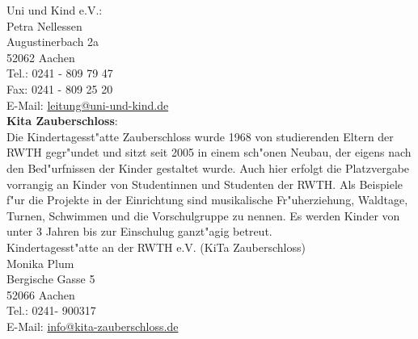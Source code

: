 \begin{artikel}{}
\vspace{-20pt}
Uni und Kind e.V.:\\
Petra Nellessen \\
Augustinerbach 2a\\
52062 Aachen\\
Tel.: 0241 - 809 79 47\\
Fax: 0241 - 809 25 20\\
E-Mail: \href{mailto:leitung@uni-und-kind.de}{leitung@uni-und-kind.de}\\

\textbf{Kita Zauberschloss}:\\
Die Kindertagesst"atte Zauberschloss wurde 1968 von studierenden Eltern der RWTH gegr"undet und sitzt seit 2005 in einem sch"onen Neubau, der eigens nach den Bed"urfnissen der Kinder gestaltet wurde. Auch hier erfolgt die Platzvergabe vorrangig an Kinder von Studentinnen und Studenten der RWTH. Als Beispiele f"ur die Projekte in der Einrichtung sind musikalische Fr"uherziehung, Waldtage, Turnen, Schwimmen und die Vorschulgruppe zu nennen. Es werden Kinder von unter 3 Jahren bis zur Einschulug ganzt"agig betreut.\\

Kindertagesst"atte an der RWTH e.V. (KiTa Zauberschloss)\\
Monika Plum\\
Bergische Gasse 5\\
52066 Aachen\\
Tel.: 0241- 900317\\
E-Mail: \href{mailto:info@kita-zauberschloss.de}{info@kita-zauberschloss.de}\\



\end{artikel}
